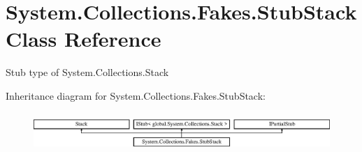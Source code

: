 \hypertarget{class_system_1_1_collections_1_1_fakes_1_1_stub_stack}{\section{System.\-Collections.\-Fakes.\-Stub\-Stack Class Reference}
\label{class_system_1_1_collections_1_1_fakes_1_1_stub_stack}
}


Stub type of System.\-Collections.\-Stack 


Inheritance diagram for System.\-Collections.\-Fakes.\-Stub\-Stack\-:\begin{figure}[H]
\begin{center}
\leavevmode
\includegraphics[height=1.487384cm]{class_system_1_1_collections_1_1_fakes_1_1_stub_stack}
\end{center}
\end{figure}
